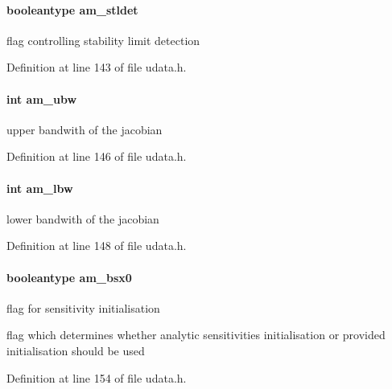 \paragraph[{am\+\_\+stldet}]{\setlength{\rightskip}{0pt plus 5cm}booleantype am\+\_\+stldet}\label{struct_user_data_a7d39c238c319f0164a15744950bfd021}
flag controlling stability limit detection 

Definition at line 143 of file udata.\+h.

\hypertarget{struct_user_data_a7283826ef630f92bb04052eb79a377e5}{}
\paragraph[{am\+\_\+ubw}]{\setlength{\rightskip}{0pt plus 5cm}int am\+\_\+ubw}\label{struct_user_data_a7283826ef630f92bb04052eb79a377e5}
upper bandwith of the jacobian 

Definition at line 146 of file udata.\+h.

\hypertarget{struct_user_data_a0fd271dea83e804c7b1ef82a2b0ab76c}{}
\paragraph[{am\+\_\+lbw}]{\setlength{\rightskip}{0pt plus 5cm}int am\+\_\+lbw}\label{struct_user_data_a0fd271dea83e804c7b1ef82a2b0ab76c}
lower bandwith of the jacobian 

Definition at line 148 of file udata.\+h.

\hypertarget{struct_user_data_a87d2f917b1bea7fea2d5878ccd43c7db}{}
\paragraph[{am\+\_\+bsx0}]{\setlength{\rightskip}{0pt plus 5cm}booleantype am\+\_\+bsx0}\label{struct_user_data_a87d2f917b1bea7fea2d5878ccd43c7db}
flag for sensitivity initialisation

flag which determines whether analytic sensitivities initialisation or provided initialisation should be used 

Definition at line 154 of file udata.\+h.

\hypertarget{struct_user_data_a7ac27602345668b3a2bcabac4c7af733}{}
